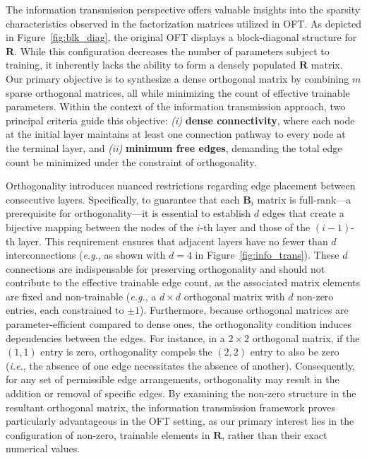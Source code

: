 The information transmission perspective offers valuable insights into the sparsity characteristics observed in the factorization matrices utilized in OFT. As depicted in Figure~\ref{fig:blk_diag}, the original OFT displays a block-diagonal structure for $\bm{R}$. While this configuration decreases the number of parameters subject to training, it inherently lacks the ability to form a densely populated $\bm{R}$ matrix. Our primary objective is to synthesize a dense orthogonal matrix by combining $m$ sparse orthogonal matrices, all while minimizing the count of effective trainable parameters. Within the context of the information transmission approach, two principal criteria guide this objective: \emph{(i)} \textbf{dense connectivity}, where each node at the initial layer maintains at least one connection pathway to every node at the terminal layer, and \emph{(ii)} \textbf{minimum free edges}, demanding the total edge count be minimized under the constraint of orthogonality. 

Orthogonality introduces nuanced restrictions regarding edge placement between consecutive layers. Specifically, to guarantee that each $\bm{B}_i$ matrix is full-rank—a prerequisite for orthogonality—it is essential to establish $d$ edges that create a bijective mapping between the nodes of the $i$-th layer and those of the $(i-1)$-th layer. This requirement ensures that adjacent layers have no fewer than $d$ interconnections (\emph{e.g.}, as shown with $d = 4$ in Figure~\ref{fig:info_trans}). These $d$ connections are indispensable for preserving orthogonality and should not contribute to the effective trainable edge count, as the associated matrix elements are fixed and non-trainable (\emph{e.g.}, a $d\times d$ orthogonal matrix with $d$ non-zero entries, each constrained to $\pm 1$). Furthermore, because orthogonal matrices are parameter-efficient compared to dense ones, the orthogonality condition induces dependencies between the edges. For instance, in a $2\times 2$ orthogonal matrix, if the $(1,1)$ entry is zero, orthogonality compels the $(2,2)$ entry to also be zero (\emph{i.e.}, the absence of one edge necessitates the absence of another). Consequently, for any set of permissible edge arrangements, orthogonality may result in the addition or removal of specific edges. By examining the non-zero structure in the resultant orthogonal matrix, the information transmission framework proves particularly advantageous in the OFT setting, as our primary interest lies in the configuration of non-zero, trainable elements in $\bm{R}$, rather than their exact numerical values.

